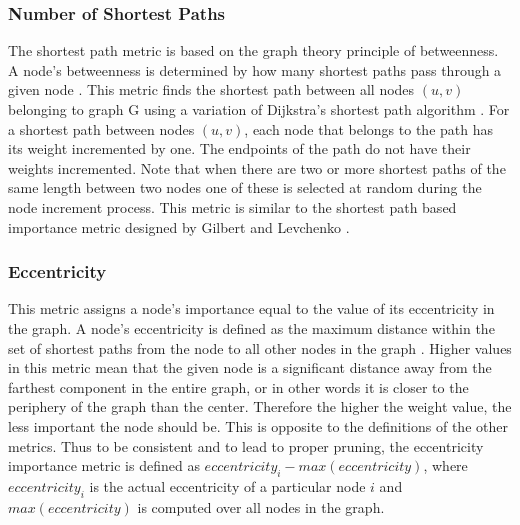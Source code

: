 \subsubsection{Number of Shortest Paths}
The shortest path metric is based on the graph theory principle of betweenness.  A node's betweenness is determined by  how many shortest paths pass through a given node \cite{Wei07}.  This metric finds the shortest path between all nodes $(u,v)$ belonging to graph G using a variation of Dijkstra's shortest path algorithm \cite{Har69}.  For a shortest path between nodes $(u,v)$, each node that belongs to the path has its weight incremented by one. The endpoints of the path do not have their weights incremented. Note that when there are two or more shortest paths of the same length between two nodes one of these is selected at random during the node increment process.
This metric is similar to the shortest path based importance metric designed by Gilbert and Levchenko \cite{Gilbert-Levchenko04}.

\subsubsection{Eccentricity}
This metric assigns a node's importance equal to the value of its eccentricity in the graph.  A node's eccentricity is defined as the maximum distance within the set of shortest paths from the node to all other nodes in the graph \cite{Har69}.  Higher values in this metric mean that the given node is a significant distance away from the farthest component in the entire graph, or in other words it is closer to the periphery of the graph than the center.  Therefore the higher the weight value, the less important the node should be.  This is opposite to the definitions of the other metrics.  Thus to be consistent and to lead to proper pruning, the eccentricity importance metric is defined as $eccentricity_i - max(eccentricity)$, where $eccentricity_i$ is the actual eccentricity of a particular node $i$ and $max(eccentricity)$ is computed over all nodes in the graph.

